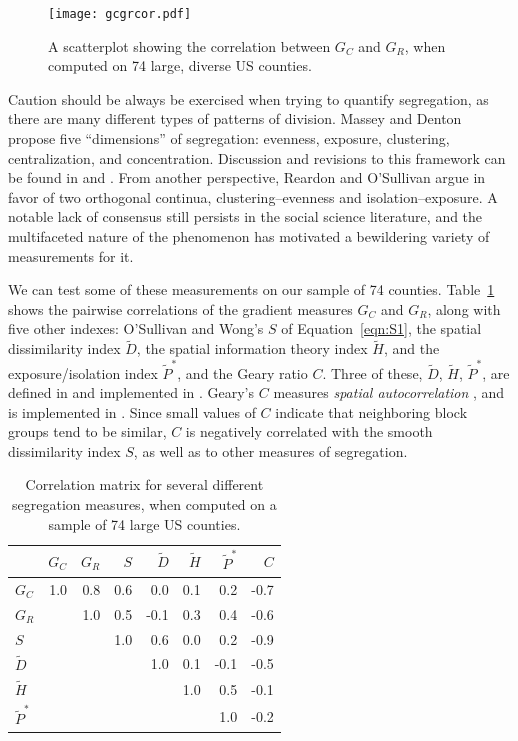\documentclass{article}
\theoremstyle{theorem}
\theoremstyle{definition}
\begin{document}
\begin{figure}
  \texttt{[image: gcgrcor.pdf]}
  \caption{A scatterplot showing the correlation between $G_C$ and $G_R$, when computed on 74 large, diverse US counties.}
  \label{fig:gcgrcor}
\end{figure}

Caution should be always be exercised when trying to quantify segregation, as there are many different types of patterns of division. Massey and Denton \cite{masseydenton88}  propose five ``dimensions'' of segregation: evenness, exposure, clustering, centralization, and concentration. Discussion and revisions to this framework can be found in \cite{johnston07} and \cite{brownchung06}. From another perspective, Reardon and O'Sullivan \cite{reardonosullivan04} argue in favor of two orthogonal continua, clustering--evenness and isolation--exposure. A notable lack of consensus still persists in the social science literature, and the multifaceted nature of the phenomenon has motivated a bewildering variety of measurements for it. \cite{harrisjohnson18}

We can test some of these measurements on our sample of 74 counties. Table~\ref{tab:indexcor} shows the pairwise correlations of the gradient measures $G_C$ and $G_R$, along with five other indexes: O'Sullivan and Wong's $S$ of Equation~\ref{eqn:S1}, the spatial dissimilarity index $\tilde{D}$, the spatial information theory index $\tilde{H}$, and the exposure/isolation index $\tilde{P}^*$, and the Geary ratio $C$. Three of these, $\tilde{D}$, $\tilde{H}$, $\tilde{P}^*$, are defined in \cite{reardonosullivan04} and implemented in \cite{hong14}. Geary's $C$ measures \textit{spatial autocorrelation} \cite{clifford81}, and is implemented in \cite{bivand19}. Since small values of $C$ indicate that neighboring block groups tend to be similar, $C$ is negatively correlated with the smooth dissimilarity index $S$, as well as to other measures of segregation.

\begin{table}[h!]
\centering
\begin{tabular}{l|rrrrrrr} %
   & $G_C$ & $G_R$ & $S$ & $\tilde{D}$ &  $\tilde{H}$ & $\tilde{P}^*$ & $C$ \\
  \hline
  $G_C$ & 1.0 & 0.8 & 0.6 & 0.0 & 0.1 & 0.2 & -0.7 \\
  $G_R$ &  & 1.0 & 0.5 & -0.1 & 0.3 & 0.4 & -0.6 \\
  $S$ &  &  & 1.0 & 0.6 & 0.0 & 0.2 & -0.9 \\
  $\tilde{D}$ &  &  &  & 1.0 & 0.1 & -0.1 & -0.5 \\
  $\tilde{H}$ &  &  &  &  & 1.0 & 0.5 & -0.1\\
  $\tilde{P}^*$ &  &  &  &  &  & 1.0 & -0.2  \\
\end{tabular}
\caption{Correlation matrix for several different segregation measures, when computed on a sample of 74 large US counties.}
\label{tab:indexcor}
\end{table}
\end{document}
